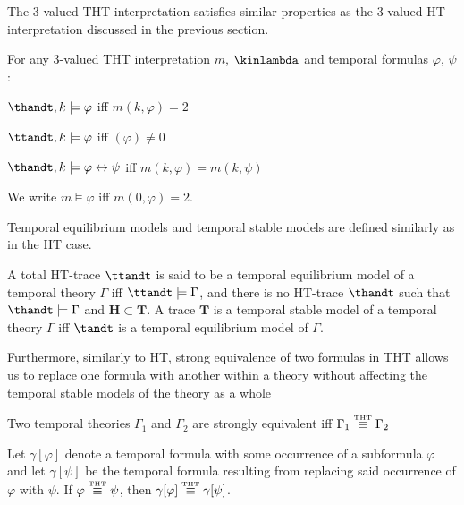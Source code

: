 The 3-valued THT interpretation satisfies similar properties as the
3-valued HT interpretation discussed in the previous section.

\begin{proposition}
  For any 3-valued THT interpretation $m$, $\kinlambda$ and temporal
  formulas $\varphi$, $\psi$:
\begin{description}
  \item $\thandt,k \models \varphi$ iff $m(k,\varphi) = 2$
  \item $\ttandt,k \models \varphi$ iff $(\varphi) \neq 0$
  \item $\thandt,k \models \varphi \leftrightarrow \psi$ iff $m(k,\varphi) = m(k,\psi)$
\end{description}
\end{proposition}

We write $m \models \varphi$ iff $m(0,\varphi)=2$.

Temporal equilibrium models and temporal stable models are defined
similarly as in the HT case.

\begin{definition}
  A total HT-trace $\ttandt$ is said to be a temporal equilibrium
  model of a temporal theory $\Gamma$ iff $\ttandt \models \Gamma$,
  and there is no HT-trace $\thandt$ such that $\thandt \models \Gamma$ and
  $\bm{H} \subset \bm{T}$. A trace $\bm{T}$ is a temporal stable model of a temporal theory $\Gamma$ iff
  $\tandt$ is a temporal equilibrium model of $\Gamma$.
\end{definition}

Furthermore, similarly to HT, strong equivalence of two formulas in
THT allows us to replace one formula with another within a theory
without affecting the temporal stable models of the theory as a whole

\begin{proposition}
  Two temporal theories $\Gamma_1$ and $\Gamma_2$ are strongly equivalent
  iff $\Gamma_1 \stackrel{\normalfont\mbox{\tiny THT}}{\equiv} \Gamma_2$
\end{proposition}

\begin{proposition}
  Let $\gamma[\varphi]$ denote a temporal formula with some occurrence of a
  subformula $\varphi$ and let $\gamma[\psi]$ be the temporal formula resulting
  from replacing said occurrence of $\varphi$ with $\psi$. If
  $\varphi \stackrel{\normalfont\mbox{\tiny THT}}{\equiv} \psi$, then $\gamma[\varphi] \stackrel{\normalfont\mbox{\tiny THT}}{\equiv} \gamma[\psi]$.
\end{proposition}